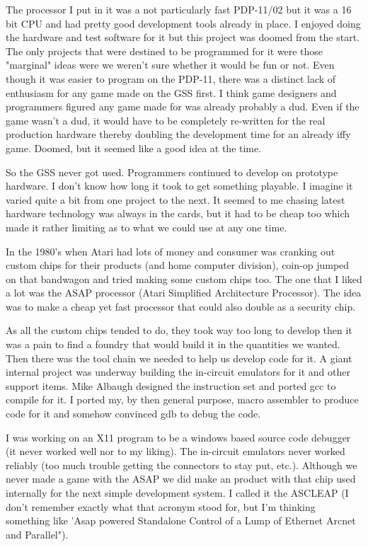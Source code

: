 The processor I put in it was a not particularly fast PDP-11/02 but it was a 16 bit CPU and had pretty good development tools already in place. I enjoyed doing the hardware and test software for it but this project was doomed from the start. The only projects that were destined to be programmed for it were those "marginal" ideas were we weren't sure whether it would be fun or not. Even though it was easier to program on the PDP-11, there was a distinct lack of enthusiasm for any game made on the GSS first. I think game designers and programmers figured any game made for was already probably a dud. Even if the game wasn't a dud, it would have to be completely re-written for the real production hardware thereby doubling the development time for an already iffy game. Doomed, but it seemed like a good idea at the time. 

So the GSS never got used. Programmers continued to develop on prototype hardware. I don't know how long it took to get something playable. I imagine it varied quite a bit from one project to the next. It seemed to me chasing latest hardware technology was always in the cards, but it had to be cheap too which made it rather limiting as to what we could use at any one time. 

In the 1980's when Atari had lots of money and consumer was cranking out custom chips for their products (and home computer division), coin-op jumped on that bandwagon and tried making some custom chips too. The one that I liked a lot was the ASAP processor (Atari Simplified Architecture Processor). The idea was to make a cheap yet fast processor that could also double as a security chip. 

As all the custom chips tended to do, they took way too long to develop then it was a pain to find a foundry that would build it in the quantities we wanted. Then there was the tool chain we needed to help us develop code for it. A giant internal project was underway building the in-circuit emulators for it and other support items. Mike Albaugh designed the instruction set and ported gcc to compile for it. I ported my, by then general purpose, macro assembler to produce code for it and somehow convinced gdb to debug the code. 

I was working on an X11 program to be a windows based source code debugger (it never worked well nor to my liking). The in-circuit emulators never worked reliably (too much trouble getting the connectors to stay put, etc.). Although we never made a game with the ASAP we did make an product with that chip used internally for the next simple development system. I called it the ASCLEAP (I don't remember exactly what that acronym stood for, but I'm thinking something like 'Asap powered Standalone Control of a Lump of Ethernet Arcnet and Parallel"). 

